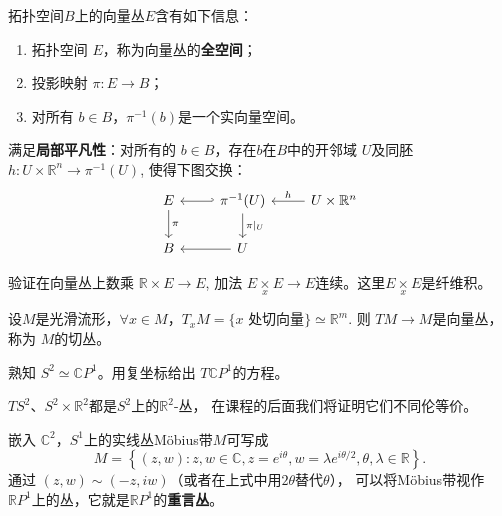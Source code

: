     \begin{definition}[向量丛]
        拓扑空间$B$上的向量丛$E$含有如下信息：
        \begin{enumerate}
            \item 拓扑空间 $E$，称为向量丛的\textbf{全空间}；
            \item 投影映射 $\pi :E\rightarrow B$；
            \item 对所有 $b\in B$，$\pi^{-1}(b)$是一个实向量空间。
        \end{enumerate}
        满足\textbf{局部平凡性}：对所有的 $b\in B$，存在$b$在$B$中的开邻域
        $U$及同胚 $h:U\times \mathbb{R}^n \rightarrow \pi^{-1}(U)$,
        使得下图交换：
        $$
            \begin{tikzcd}
            E \arrow[d, "\pi"] & \pi^{-1}(U) \arrow[l, hook'] \arrow[d, "\pi|_U"] & U\times \mathbb{R}^n \arrow[l, "h"'] \\
            B                  & U \arrow[l]                                      &                                     
            \end{tikzcd}
        $$
    \end{definition}

    \begin{exercise}
        验证在向量丛上数乘 $\mathbb{R}\times E\rightarrow E$,
        加法 $E\underset{x}{\times}E\rightarrow E$连续。这里$E\underset{x}{\times}E$是纤维积。
    \end{exercise}

    \begin{example}[切丛]
        设$M$是光滑流形，$\forall x\in M$，$T_x M=\{x\text{ 处切向量}\}\simeq \mathbb{R}^m$.
        则 $TM\rightarrow M$是向量丛，称为 $M$的切丛。
    \end{example}
    
    \begin{exercise}
        熟知 $S^2\simeq \mathbb{C}P^1$。用复坐标给出 $T\mathbb{C}P^1$的方程。
    \end{exercise}

    \begin{example}
        $TS^2$、$S^2\times \mathbb{R}^2$都是$S^2$上的$\mathbb{R}^2$-丛，
        在课程的后面我们将证明它们不同伦等价。
    \end{example}

    \begin{example}[Möbius带]
        嵌入 $\mathbb{C}^2$，$S^1$上的实线丛Möbius带$M$可写成
        $$
            M=\left\{ (z,w): 
            z,w\in \mathbb{C},z=e^{i\theta},w=\lambda e^{i\theta/2},
            \theta,\lambda \in \mathbb{R} \right\}.
        $$
        通过 $(z,w)\sim (-z,iw)$（或者在上式中用$2\theta$替代$\theta$），
        可以将Möbius带视作 $\mathbb{R}P^1$上的丛，它就是$\mathbb{R}P^1$的\textbf{重言丛}。
    \end{example}

